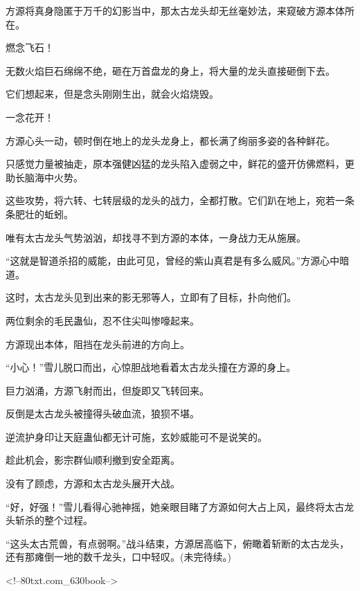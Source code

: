 \begin{this_body}
方源将真身隐匿于万千的幻影当中，那太古龙头却无丝毫妙法，来窥破方源本体所在。

燃念飞石！

无数火焰巨石绵绵不绝，砸在万首盘龙的身上，将大量的龙头直接砸倒下去。

它们想起来，但是念头刚刚生出，就会火焰烧毁。

一念花开！

方源心头一动，顿时倒在地上的龙头龙身上，都长满了绚丽多姿的各种鲜花。

只感觉力量被抽走，原本强健凶猛的龙头陷入虚弱之中，鲜花的盛开仿佛燃料，更助长脑海中火势。

这些攻势，将六转、七转层级的龙头的战力，全都打散。它们趴在地上，宛若一条条肥壮的蚯蚓。

唯有太古龙头气势汹汹，却找寻不到方源的本体，一身战力无从施展。

“这就是智道杀招的威能，由此可见，曾经的紫山真君是有多么威风。”方源心中暗道。

这时，太古龙头见到出来的影无邪等人，立即有了目标，扑向他们。

两位剩余的毛民蛊仙，忍不住尖叫惨嚎起来。

方源现出本体，阻挡在龙头前进的方向上。

“小心！”雪儿脱口而出，心惊胆战地看着太古龙头撞在方源的身上。

巨力汹涌，方源飞射而出，但旋即又飞转回来。

反倒是太古龙头被撞得头破血流，狼狈不堪。

逆流护身印让天庭蛊仙都无计可施，玄妙威能可不是说笑的。

趁此机会，影宗群仙顺利撤到安全距离。

没有了顾虑，方源和太古龙头展开大战。

“好，好强！”雪儿看得心驰神摇，她亲眼目睹了方源如何大占上风，最终将太古龙头斩杀的整个过程。

“这头太古荒兽，有点弱啊。”战斗结束，方源居高临下，俯瞰着斩断的太古龙头，还有那瘫倒一地的数千龙头，口中轻叹。(未完待续。)

<!--80txt.com\_630book-->

\end{this_body}

